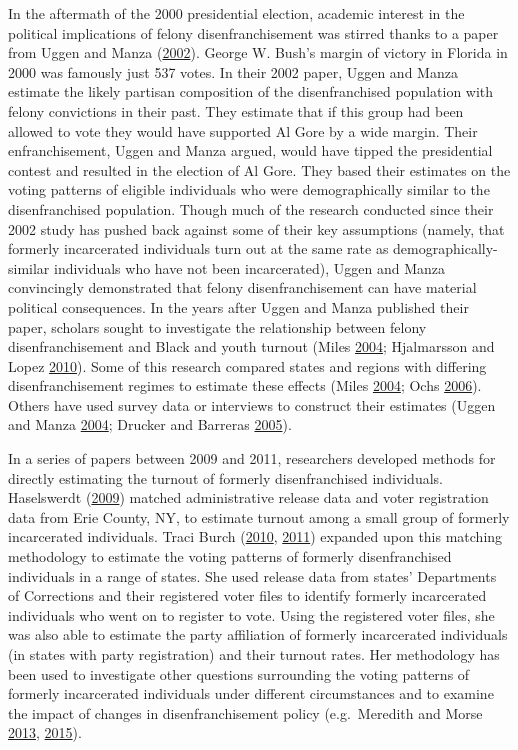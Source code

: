 \documentclass[
  12pt,
]{article}
\begin{document}
In the aftermath of the 2000 presidential election, academic interest in the political implications of felony disenfranchisement was stirred thanks to a paper from Uggen and Manza (\protect\hyperlink{ref-Uggen2002}{2002}). George W. Bush's margin of victory in Florida in 2000 was famously just 537 votes. In their 2002 paper, Uggen and Manza estimate the likely partisan composition of the disenfranchised population with felony convictions in their past. They estimate that if this group had been allowed to vote they would have supported Al Gore by a wide margin. Their enfranchisement, Uggen and Manza argued, would have tipped the presidential contest and resulted in the election of Al Gore. They based their estimates on the voting patterns of eligible individuals who were demographically similar to the disenfranchised population. Though much of the research conducted since their 2002 study has pushed back against some of their key assumptions (namely, that formerly incarcerated individuals turn out at the same rate as demographically-similar individuals who have not been incarcerated), Uggen and Manza convincingly demonstrated that felony disenfranchisement can have material political consequences. In the years after Uggen and Manza published their paper, scholars sought to investigate the relationship between felony disenfranchisement and Black and youth turnout (Miles \protect\hyperlink{ref-Miles2004}{2004}; Hjalmarsson and Lopez \protect\hyperlink{ref-Hjalmarsson2010}{2010}). Some of this research compared states and regions with differing disenfranchisement regimes to estimate these effects (Miles \protect\hyperlink{ref-Miles2004}{2004}; Ochs \protect\hyperlink{ref-Ochs2006}{2006}). Others have used survey data or interviews to construct their estimates (Uggen and Manza \protect\hyperlink{ref-Uggen2004}{2004}; Drucker and Barreras \protect\hyperlink{ref-Drucker2005}{2005}).

In a series of papers between 2009 and 2011, researchers developed methods for directly estimating the turnout of formerly disenfranchised individuals. Haselswerdt (\protect\hyperlink{ref-Haselswerdt2009}{2009}) matched administrative release data and voter registration data from Erie County, NY, to estimate turnout among a small group of formerly incarcerated individuals. Traci Burch (\protect\hyperlink{ref-Burch2010}{2010}, \protect\hyperlink{ref-Burch2011}{2011}) expanded upon this matching methodology to estimate the voting patterns of formerly disenfranchised individuals in a range of states. She used release data from states' Departments of Corrections and their registered voter files to identify formerly incarcerated individuals who went on to register to vote. Using the registered voter files, she was also able to estimate the party affiliation of formerly incarcerated individuals (in states with party registration) and their turnout rates. Her methodology has been used to investigate other questions surrounding the voting patterns of formerly incarcerated individuals under different circumstances and to examine the impact of changes in disenfranchisement policy (e.g.~Meredith and Morse \protect\hyperlink{ref-Meredith2013}{2013}, \protect\hyperlink{ref-Meredith2015}{2015}).
\end{document}
